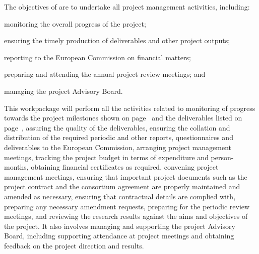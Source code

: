 \addtocounter{wpno}{1}

\begin{Workpackage}{\thewpno}
\WPTitle{\wpname{\thewpno}}

\begin{WPObjectives}
The objectives of \theWP{} are to undertake all project management activities, including:
\begin{compactitem}
\item
monitoring the overall progress of the project;
\item
ensuring the timely production of deliverables and other project outputs;
\item
reporting to the European Commission on financial matters;
\item
preparing and attending the annual project review meetings; and

\item
managing the project Advisory Board.
\end{compactitem}
\end{WPObjectives}

\begin{WPDescription}
This workpackage will perform all the activities related to monitoring
of progress towards the project milestones shown on page~\pageref{sect:milestones}
and the deliverables listed on page~\pageref{sect:deliverables},
assuring the quality of the deliverables, ensuring the
collation and distribution of the required periodic and other reports,
questionnaires and deliverables to
the European Commission, arranging project management meetings, tracking
the project budget in terms of expenditure and person-months,
obtaining financial certificates as required, convening project
management meetings, ensuring that important project documents
such as the project contract and the consortium agreement are
properly maintained and amended as necessary, ensuring that
contractual details are complied with, preparing any necessary amendment requests,
preparing for the periodic review meetings, and reviewing the research
results against the aims and objectives of the project.
It also involves managing and supporting the project
Advisory Board, including supporting attendance at project
meetings and obtaining feedback on the project direction and
results.
\end{WPDescription}


\end{Workpackage}
